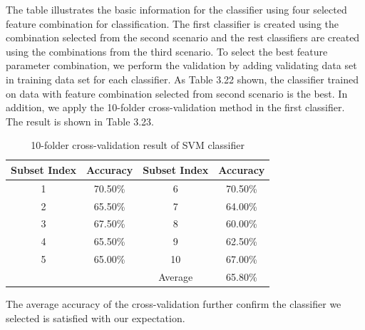 The table illustrates the basic information for the classifier using four selected feature combination for classification. The first classifier is created using the combination selected from the second scenario and the rest classifiers are created using the combinations from the third scenario. To select the best feature parameter combination, we perform the validation by adding validating data set in training data set for each classifier. As Table 3.22 shown, the classifier trained on data with feature combination selected from second scenario is the best. In addition, we apply the 10-folder cross-validation method in the first classifier. The result is shown in Table 3.23. 
\begin{table}[!h]
\begin{center}
\begin{tabular}{||c c | c c ||}
\hline
Subset Index & Accuracy & Subset Index & Accuracy \\[0.7ex]
\hline\hline
1 & 70.50\% & 6 & 70.50\% \\
2 & 65.50\% & 7 & 64.00\% \\
3 & 67.50\% & 8 & 60.00\% \\
4 & 65.50\% & 9 & 62.50\% \\
5 & 65.00\% & 10 & 67.00\%  \\
\hline
 & & Average & 65.80\% \\
\hline
\end{tabular}
\caption {10-folder cross-validation result of SVM classifier}
\end{center}
\end{table}
The average accuracy of the cross-validation further confirm the classifier we selected is satisfied with our expectation. 
